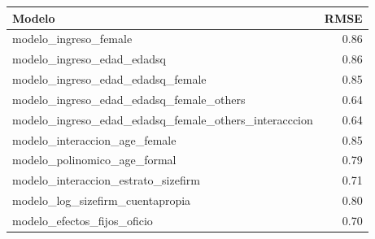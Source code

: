 \begin{table}[ht]
\centering
\begin{tabular}{lr}
  \hline
Modelo & RMSE \\ 
  \hline
modelo\_ingreso\_female & 0.86 \\ 
  modelo\_ingreso\_edad\_edadsq & 0.86 \\ 
  modelo\_ingreso\_edad\_edadsq\_female & 0.85 \\ 
  modelo\_ingreso\_edad\_edadsq\_female\_others & 0.64 \\ 
  modelo\_ingreso\_edad\_edadsq\_female\_others\_interacccion & 0.64 \\ 
  modelo\_interaccion\_age\_female & 0.85 \\ 
  modelo\_polinomico\_age\_formal & 0.79 \\ 
  modelo\_interaccion\_estrato\_sizefirm & 0.71 \\ 
  modelo\_log\_sizefirm\_cuentapropia & 0.80 \\ 
  modelo\_efectos\_fijos\_oficio & 0.70 \\ 
   \hline
\end{tabular}
\end{table}
